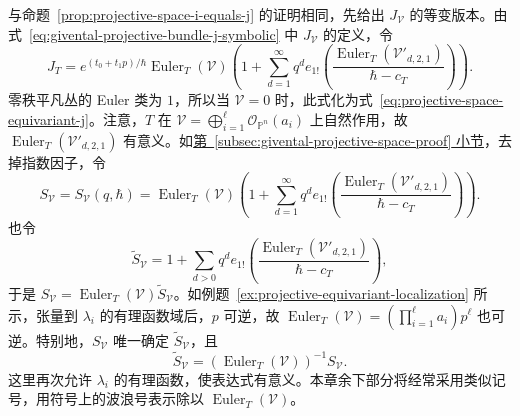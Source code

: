 与命题~\ref{prop:projective-space-i-equals-j} 的证明相同，先给出 $J_{\mathcal V}$ 的等变版本。由式~\eqref{eq:givental-projective-bundle-j-symbolic} 中 $J_{\mathcal V}$ 的定义，令
\begin{equation}\label{eq:complete-intersection-equivariant-j}
J_T=e^{(t_0+t_1p)/\hbar}\operatorname{Euler}_T(\mathcal V)
\left(1+\sum_{d=1}^{\infty}q^d e_{1!}\left(\frac{\operatorname{Euler}_T(\mathcal V'_{d,2,1})}{\hbar-c_T}\right)\right).
\end{equation}
零秩平凡丛的 Euler 类为 $1$，所以当 $\mathcal V=0$ 时，此式化为式~\eqref{eq:projective-space-equivariant-j}。注意，$T$ 在 $\mathcal V=\bigoplus_{i=1}^{\ell}\mathcal O_{\mathbb P^n}(a_i)$ 上自然作用，故 $\operatorname{Euler}_T(\mathcal V'_{d,2,1})$ 有意义。如\hyperref[subsec:givental-projective-space-proof]{第~\ref*{subsec:givental-projective-space-proof} 小节}，去掉指数因子，令
\begin{equation}\label{eq:complete-intersection-equivariant-s}
S_{\mathcal V}=S_{\mathcal V}(q,\hbar)=\operatorname{Euler}_T(\mathcal V)
\left(1+\sum_{d=1}^{\infty}q^d e_{1!}\left(\frac{\operatorname{Euler}_T(\mathcal V'_{d,2,1})}{\hbar-c_T}\right)\right).
\end{equation}
也令
\[
\widetilde S_{\mathcal V}=1+\sum_{d>0}q^d e_{1!}\left(\frac{\operatorname{Euler}_T(\mathcal V'_{d,2,1})}{\hbar-c_T}\right),
\]
于是 $S_{\mathcal V}=\operatorname{Euler}_T(\mathcal V)\widetilde S_{\mathcal V}$。如例题~\ref{ex:projective-equivariant-localization} 所示，张量到 $\lambda_i$ 的有理函数域后，$p$ 可逆，故 $\operatorname{Euler}_T(\mathcal V)=(\prod_{i=1}^{\ell}a_i)p^\ell$ 也可逆。特别地，$S_{\mathcal V}$ 唯一确定 $\widetilde S_{\mathcal V}$，且
\[
\widetilde S_{\mathcal V}=(\operatorname{Euler}_T(\mathcal V))^{-1}S_{\mathcal V}.
\]
这里再次允许 $\lambda_i$ 的有理函数，使表达式有意义。本章余下部分将经常采用类似记号，用符号上的波浪号表示除以 $\operatorname{Euler}_T(\mathcal V)$。

